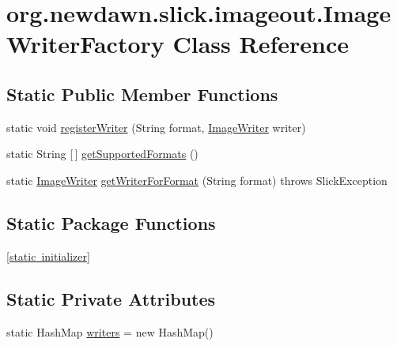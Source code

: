 \hypertarget{classorg_1_1newdawn_1_1slick_1_1imageout_1_1_image_writer_factory}{}\section{org.\+newdawn.\+slick.\+imageout.\+Image\+Writer\+Factory Class Reference}
\label{classorg_1_1newdawn_1_1slick_1_1imageout_1_1_image_writer_factory}
\subsection*{Static Public Member Functions}
\begin{DoxyCompactItemize}
\item 
static void \mbox{\hyperlink{classorg_1_1newdawn_1_1slick_1_1imageout_1_1_image_writer_factory_aae1627abc6baf783f35228fe52ba1fd7}{register\+Writer}} (String format, \mbox{\hyperlink{interfaceorg_1_1newdawn_1_1slick_1_1imageout_1_1_image_writer}{Image\+Writer}} writer)
\item 
static String \mbox{[}$\,$\mbox{]} \mbox{\hyperlink{classorg_1_1newdawn_1_1slick_1_1imageout_1_1_image_writer_factory_a582dd022e333ee816d486158729f226a}{get\+Supported\+Formats}} ()
\item 
static \mbox{\hyperlink{interfaceorg_1_1newdawn_1_1slick_1_1imageout_1_1_image_writer}{Image\+Writer}} \mbox{\hyperlink{classorg_1_1newdawn_1_1slick_1_1imageout_1_1_image_writer_factory_aaf5d5c5091ad1514a9610313253757cb}{get\+Writer\+For\+Format}} (String format)  throws Slick\+Exception 	
\end{DoxyCompactItemize}
\subsection*{Static Package Functions}
\begin{DoxyCompactItemize}
\item 
\mbox{\hyperlink{classorg_1_1newdawn_1_1slick_1_1imageout_1_1_image_writer_factory_acdaa3d6484a55dea0b637cd6a805941a}{\mbox{[}static initializer\mbox{]}}}
\end{DoxyCompactItemize}
\subsection*{Static Private Attributes}
\begin{DoxyCompactItemize}
\item 
static Hash\+Map \mbox{\hyperlink{classorg_1_1newdawn_1_1slick_1_1imageout_1_1_image_writer_factory_a93deff6a9953d95273a8a2a50520318d}{writers}} = new Hash\+Map()
\end{DoxyCompactItemize}


